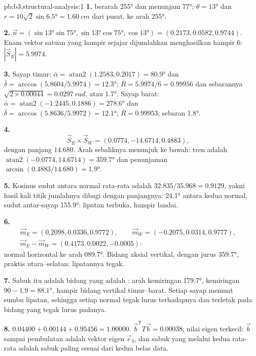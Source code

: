\begin{solution}{pb:b3:structural-analysis:1}
\textbf{1.}  berarah \ang{255} dan menunjam \ang{77}; $\theta =
\ang{13}$ dan $r = 10\sqrt2\sin\ang{6.5} = \qty{1.60}{cm}$ dari pusat,
ke arah \ang{255}.

\textbf{2.} $\vec n = (\sin\ang{13}\sin\ang{75}, \sin\ang{13}\cos\ang{75},
\cos\ang{13}) = (0.2173, 0.0582, 0.9744)$. Enam vektor satuan yang hampir sejajar
dijumlahkan menghasilkan hampir 6: $|\vec S_E| = 5.9974$.

\textbf{3.} Sayap timur: $\bar\alpha = \operatorname{atan2}(1.2583, 0.2017) =
\ang{80.9}$ dan $\bar\delta = \arccos(5.8604/5.9974) = \ang{12.3}$; $\bar R
= 5.9974/6 = 0.99956$ dan sebarannya $\sqrt{2\times0.00044} =
\qty{0.0297}{rad}$, atau \ang{1.7}. Sayap barat: $\bar\alpha =
\operatorname{atan2}(-1.2445, 0.1886) = \ang{278.6}$ dan $\bar\delta =
\arccos(5.8636/5.9972) = \ang{12.1}$; $\bar R = 0.99953$, sebaran \ang{1.8}.

\textbf{4.}
\[
  \vec S_E\times\vec S_W = (0.0774, -14.6714, 0.4883),
\]
dengan panjang $14.680$. Arah sebaliknya menunjuk ke bawah: tren adalah $\operatorname{atan2}(-0.0774, 14.6714) = \ang{359.7}$ dan
penunjaman $\arcsin(0.4883/14.680) = \ang{1.9}$.

\textbf{5.} Kosinus sudut antara normal rata-rata adalah
$32.835/35.968 = 0.9129$, yakni hasil kali titik jumlahnya dibagi
dengan panjangnya: \ang{24.1} antara kedua normal, sudut antar-sayap \ang{155.9}:
lipatan terbuka, hampir landai.

\textbf{6.}
\begin{gather*}
  \vec m_E = (0.2098, 0.0336, 0.9772),\qquad \vec m_W = (-0.2075, 0.0314, 0.9777),\\
  \vec m_E - \vec m_W = (0.4173, 0.0022, -0.0005):
\end{gather*}
normal horizontal ke arah \ang{089.7}. Bidang aksial vertikal, dengan jurus
\ang{359.7}, praktis utara--selatan: lipatannya tegak.

\textbf{7.} Sabuk itu adalah bidang yang  adalah : arah kemiringan
\ang{179.7}, kemiringan $90 - 1.9 = \ang{88.1}$, hampir bidang vertikal
timur--barat. Setiap sayap memuat sumbu lipatan, sehingga setiap normal tegak lurus
terhadapnya dan terletak pada bidang yang tegak lurus padanya.

\textbf{8.} $0.04400 + 0.00144 + 0.95456 = 1.00000$. $\vec b^{\mathsf T}T\vec
b = 0.00038$, nilai eigen terkecil: $\vec b$ sampai pembulatan adalah
vektor eigen $\vec e_3$, dan sabuk yang melalui kedua  rata-rata adalah
sabuk paling sesuai dari kedua belas data.


\end{solution}
